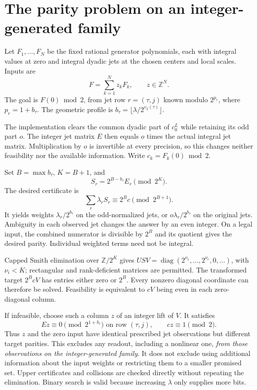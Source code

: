 \documentclass[11pt]{article}
\begin{document}
\section{The parity problem on an integer-generated family}
Let $F_1,\ldots,F_N$ be the fixed rational generator polynomials, each
with integral values at zero and integral dyadic jets at the chosen
centers and local scales. Inputs are
\[
 F=\sum_{k=1}^N z_k F_k,\qquad z\in\mathbb Z^N.
\]
The goal is $F(0)\bmod2$, from jet row $r=(\tau,j)$ known modulo
$2^{p_r}$, where $p_r=1+b_\tau$.
The geometric profile is $b_\tau=\lfloor\lambda/2^{v_2(\tau)}\rfloor$.

The implementation clears the common dyadic part of $c_0^L$ while
retaining its odd part $o$. The integer jet matrix $E$ then equals
$o$ times the actual integral jet matrix. Multiplication by $o$ is
invertible at every precision, so this changes neither feasibility nor
the available information. Write $c_k=F_k(0)\bmod2$.

Set $B=\max b_\tau$, $K=B+1$, and
\[
 S_r=2^{B-b_\tau}E_r\pmod {2^K}.
\]
The desired certificate is
\begin{equation}
 \sum_r \lambda_r S_r\equiv2^B c\pmod {2^{B+1}}.
 \label{eq:parity}
\end{equation}
It yields weights $\lambda_r/2^{b_\tau}$ on the odd-normalized jets,
or $o\lambda_r/2^{b_\tau}$ on the original jets. Ambiguity in each
observed jet changes the answer by an even integer. On a legal input,
the combined numerator is divisible by $2^B$ and its quotient gives
the desired parity. Individual weighted terms need not be integral.

Capped Smith elimination over $\mathbb Z/2^K$ gives
$USV=\operatorname{diag}(2^{\nu_1},\ldots,2^{\nu_r},0,\ldots)$,
with $\nu_i<K$; rectangular and rank-deficient matrices are permitted.
The transformed target $2^B cV$ has entries either zero or $2^B$.
Every nonzero diagonal coordinate can therefore be solved. Feasibility
is equivalent to $cV$ being even in each zero-diagonal column.

If infeasible, choose such a column $z$ of an integer lift of $V$.
It satisfies
\begin{equation}
 Ez\equiv0\pmod {2^{1+b_\tau}}\text{ on row }(\tau,j),
 \qquad cz\equiv1\pmod2.
 \label{eq:collision}
\end{equation}
Thus $z$ and the zero input have identical prescribed jet observations
but different target parities. This excludes any readout, including a
nonlinear one, \emph{from those observations on the integer-generated
family}. It does not exclude using additional information about the
input weights or restricting them to a smaller promised set.
Upper certificates and collisions are checked directly without
repeating the elimination. Binary search is valid because increasing
$\lambda$ only supplies more bits.
\end{document}
